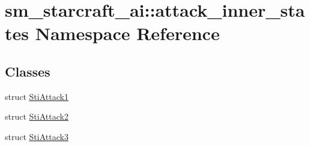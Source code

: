 \hypertarget{namespacesm__starcraft__ai_1_1attack__inner__states}{}\section{sm\+\_\+starcraft\+\_\+ai\+:\+:attack\+\_\+inner\+\_\+states Namespace Reference}
\label{namespacesm__starcraft__ai_1_1attack__inner__states}
\subsection*{Classes}
\begin{DoxyCompactItemize}
\item 
struct \hyperlink{structsm__starcraft__ai_1_1attack__inner__states_1_1StiAttack1}{Sti\+Attack1}
\item 
struct \hyperlink{structsm__starcraft__ai_1_1attack__inner__states_1_1StiAttack2}{Sti\+Attack2}
\item 
struct \hyperlink{structsm__starcraft__ai_1_1attack__inner__states_1_1StiAttack3}{Sti\+Attack3}
\end{DoxyCompactItemize}
